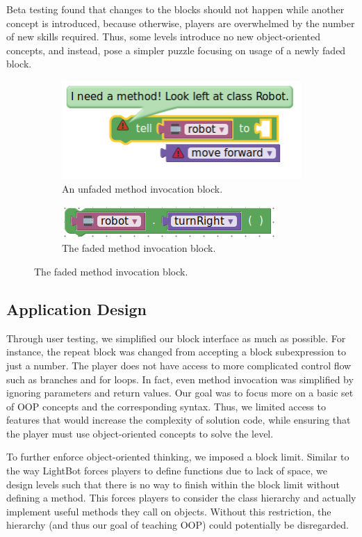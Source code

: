 \documentclass[12pt,notitlepage]{article}
\begin{document}
Beta testing found that changes to the blocks should not happen while
another concept is introduced, because otherwise, players are
overwhelmed by the number of new skills required. Thus, some levels
introduce no new object-oriented concepts, and instead, pose a simpler
puzzle focusing on usage of a newly faded block.

\begin{figure}[h]
\centering
\begin{subfigure}{.5\textwidth}
  \centering
  \includegraphics[width=.7\textwidth]{block_unfaded}
  \caption{An unfaded method invocation block.}\label{fig:block-unfaded}
\end{subfigure}%
\begin{subfigure}{.5\textwidth}
  \centering
  \includegraphics[width=.7\textwidth]{block_faded}
  \caption{The faded method invocation block.}\label{fig:block-faded}
\end{subfigure}
\label{fig:test}
\end{figure}


\subsection{Application Design}

Through user testing, we simplified our block interface as much as
possible. For instance, the repeat block was changed from accepting a
block subexpression to just a number. The player does not have access
to more complicated control flow such as branches and for loops. In
fact, even method invocation was simplified by ignoring parameters and
return values. Our goal was to focus more on a basic set of OOP
concepts and the corresponding syntax. Thus, we limited access to
features that would increase the complexity of solution code, while
ensuring that the player must use object-oriented concepts to solve
the level.

To further enforce object-oriented thinking, we imposed a block
limit. Similar to the way LightBot forces players to define functions
due to lack of space, we design levels such that there is no way to
finish within the block limit without defining a method. This forces
players to consider the class hierarchy and actually implement useful
methods they call on objects. Without this restriction, the hierarchy
(and thus our goal of teaching OOP) could potentially be disregarded.
\end{document}
